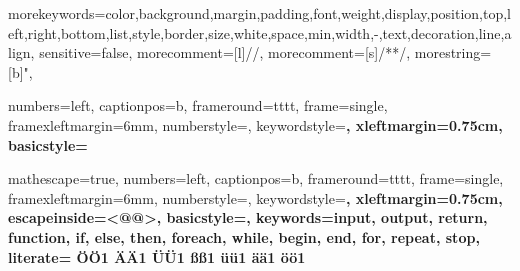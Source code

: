 
{morekeywords={color,background,margin,padding,font,weight,display,position,top,left,right,bottom,list,style,border,size,white,space,min,width,-,text,decoration,line,align},
sensitive=false,
morecomment=[l]{//},
morecomment=[s]{/*}{*/},
morestring=[b]",
}

 {
numbers=left,
captionpos=b,
frameround=tttt,
frame=single,
framexleftmargin=6mm,
numberstyle=\tiny,
keywordstyle=\ttfamily\bfseries,
xleftmargin=0.75cm,
basicstyle=\ttfamily
}

 {
mathescape=true,
numbers=left,
captionpos=b,
frameround=tttt,
frame=single,
framexleftmargin=6mm,
numberstyle=\tiny,
keywordstyle=\ttfamily\bfseries,
xleftmargin=0.75cm,
escapeinside={<@}{@>},
basicstyle=\ttfamily,
keywords={input, output, return, function, if, else, then, foreach, while, begin, end, for, repeat, stop},
literate=%
  {Ö}{{\"O}}1
  {Ä}{{\"A}}1
  {Ü}{{\"U}}1
  {ß}{{\ss}}1
  {ü}{{\"u}}1
  {ä}{{\"a}}1
  {ö}{{\"o}}1
}

